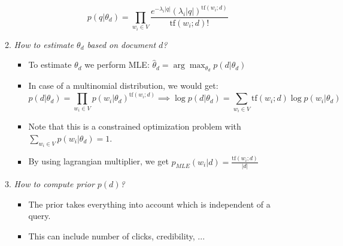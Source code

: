 \begin{itemize}
\begin{enumerate}
\begin{itemize}
			$$p(q|\theta_d) = \prod\limits_{w_i \in V} \frac{e^{-\lambda_i |q|} (\lambda_i |q|)^{\text{tf}(w_i;d)}}{\text{tf}(w_i;d)!}$$
		\end{itemize}
		\item \textit{How to estimate $\theta_d$ based on document $d$?}
		\begin{itemize}
			\item To estimate $\theta_d$ we perform MLE: $\hat{\theta}_d = \arg \max_{\theta_d} p(d|\theta_d)$
			\item In case of a multinomial distribution, we would get:
			$$p(d|\theta_d) = \prod\limits_{w_i \in V} p(w_i | \theta_d)^{\text{tf}(w_i;d)} \implies \log p(d|\theta_d) = \sum\limits_{w_i \in V} \text{tf}(w_i;d) \log p(w_i | \theta_d)$$
			\item Note that this is a constrained optimization problem with $\sum\limits_{w_i \in V} p(w_i|\theta_d) = 1$.
			\item By using lagrangian multiplier, we get $p_{MLE}(w_i|d) = \frac{\text{tf}(w_i;d)}{|d|}$
		\end{itemize}
		\item \textit{How to compute prior $p(d)$?}
		\begin{itemize}
			\item The prior takes everything into account which is independent of a query.
			\item This can include number of clicks, credibility, ...
		\end{itemize}
	\end{enumerate}
\end{itemize}
